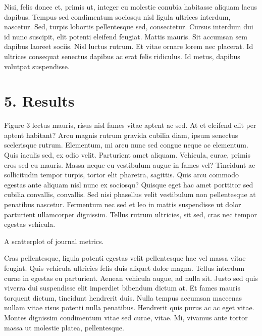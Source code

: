 \documentclass[
  12,
]{article}
\begin{document}
Nisi, felis donec et, primis ut, integer eu molestie conubia habitasse
aliquam lacus dapibus. Tempus sed condimentum sociosqu nisl ligula
ultrices interdum, nascetur. Sed, turpis lobortis pellentesque sed,
consectetur. Cursus interdum dui id nunc suscipit, elit potenti eleifend
feugiat. Mattis mauris. Sit accumsan sem dapibus laoreet sociis. Nisl
luctus rutrum. Et vitae ornare lorem nec placerat. Id ultrices consequat
senectus dapibus ac erat felis ridiculus. Id metus, dapibus volutpat
suspendisse.

\hypertarget{results}{%
\section{5. Results}\label{results}}

Figure 3 lectus mauris, risus nisl fames vitae aptent ac sed. At et
eleifend elit per aptent habitant? Arcu magnis rutrum gravida cubilia
diam, ipsum senectus scelerisque rutrum. Elementum, mi arcu nunc sed
congue neque ac elementum. Quis iaculis sed, ex odio velit. Parturient
amet aliquam. Vehicula, curae, primis eros sed eu mauris. Massa neque eu
vestibulum augue in fames vel? Tincidunt ac sollicitudin tempor turpis,
tortor elit pharetra, sagittis. Quis arcu commodo egestas ante aliquam
nisl nunc ex sociosqu? Quisque eget hac amet porttitor sed cubilia
convallis, convallis. Sed nisi phasellus velit vestibulum non
pellentesque at penatibus nascetur. Fermentum nec sed et leo in mattis
suspendisse ut dolor parturient ullamcorper dignissim. Tellus rutrum
ultricies, sit sed, cras nec tempor egestas vehicula.

A scatterplot of journal metrics.

Cras pellentesque, ligula potenti egestas velit pellentesque hac vel
massa vitae feugiat. Quis vehicula ultricies felis duis aliquet dolor
magna. Tellus interdum curae in egestas eu parturient. Aenean vehicula
augue, ad nulla sit. Justo sed quis viverra dui suspendisse elit
imperdiet bibendum dictum at. Et fames mauris torquent dictum, tincidunt
hendrerit duis. Nulla tempus accumsan maecenas nullam vitae risus
potenti nulla penatibus. Hendrerit quis purus ac ac eget vitae. Montes
dignissim condimentum vitae sed curae, vitae. Mi, vivamus ante tortor
massa ut molestie platea, pellentesque.
\end{document}
